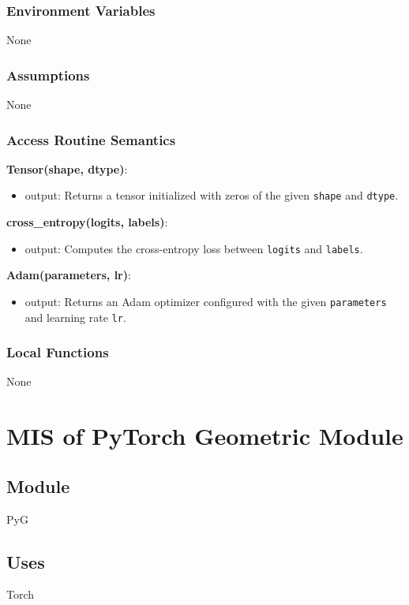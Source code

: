 \documentclass[12pt, titlepage]{article}
\begin{document}
\subsubsection{Environment Variables}
None

\subsubsection{Assumptions}
None

\subsubsection{Access Routine Semantics}

\textbf{Tensor(shape, dtype)}:
\begin{itemize}
  \item output: Returns a tensor initialized with zeros of the given \texttt{shape} and \texttt{dtype}.
\end{itemize}

\textbf{cross\_entropy(logits, labels)}:
\begin{itemize}
  \item output: Computes the cross-entropy loss between \texttt{logits} and \texttt{labels}.
\end{itemize}

\textbf{Adam(parameters, lr)}:
\begin{itemize}
  \item output: Returns an Adam optimizer configured with the given \texttt{parameters} and learning rate \texttt{lr}.
\end{itemize}

\subsubsection{Local Functions}
None



\section{MIS of PyTorch Geometric Module} \label{PyGModule}

\subsection{Module}
PyG

\subsection{Uses}
Torch
\end{document}
